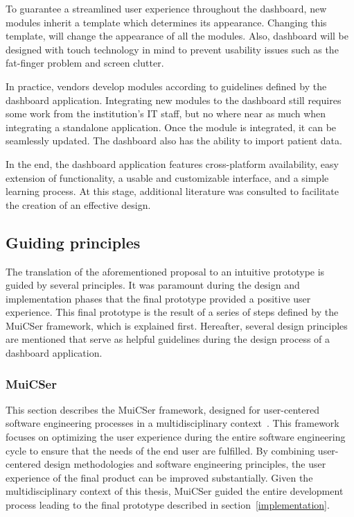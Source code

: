     \noindent To guarantee a streamlined user experience throughout the dashboard, new modules inherit a template which determines its appearance. Changing this template, will change the appearance of all the modules. Also, dashboard will be designed with touch technology in mind to prevent usability issues such as the fat-finger problem and screen clutter. 
 
    In practice, vendors develop modules according to guidelines defined by the dashboard application. Integrating new modules to the dashboard still requires some work from the institution's IT staff, but no where near as much when integrating a standalone application. Once the module is integrated, it can be seamlessly updated. The dashboard also has the ability to import patient data.\bigskip

    \noindent In the end, the dashboard application features cross-platform availability, easy extension of functionality, a usable and customizable interface, and a simple learning process. At this stage, additional literature was consulted to facilitate the creation of an effective design.

    \subsection{Guiding principles}\label{guiding_principles}

    The translation of the aforementioned proposal to an intuitive prototype is guided by several principles. It was paramount during the design and implementation phases that the final prototype provided a positive user experience. This final prototype is the result of a series of steps defined by the MuiCSer framework, which is explained first. Hereafter, several design principles are mentioned that serve as helpful guidelines during the design process of a dashboard application.

        \subsubsection{MuiCSer}\label{muicser}
        This section describes the MuiCSer framework, designed for user-centered software engineering processes in a multidisciplinary context~\cite{Haesen2008}. This framework focuses on optimizing the user experience during the entire software engineering cycle to ensure that the needs of the end user are fulfilled. By combining user-centered design methodologies and software engineering principles, the user experience of the final product can be improved substantially. Given the multidisciplinary context of this thesis, MuiCSer guided the entire development process leading to the final prototype described in section~\ref{implementation}.
        
